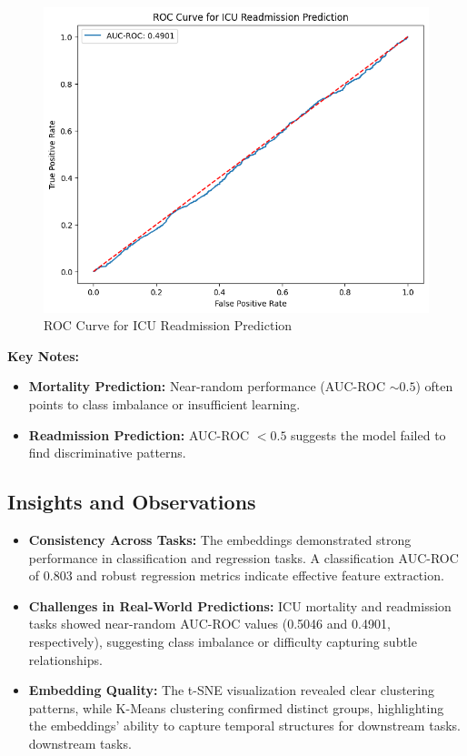 \documentclass[twocolumn]{article}
\begin{document}
    \begin{figure}[ht]
        \centering
        \includegraphics[width=0.9\linewidth]{readmission.png}
        \caption{ROC Curve for ICU Readmission Prediction}
        \label{fig:roc_readmission}
    \end{figure}
    \vspace{3cm}
    \textbf{Key Notes:}
    \begin{itemize}
        \item \textbf{Mortality Prediction:} Near-random performance (AUC-ROC $\sim
            0.5$) often points to class imbalance or insufficient learning.

        \item \textbf{Readmission Prediction:} AUC-ROC $< 0.5$ suggests the
            model failed to find discriminative patterns.
    \end{itemize}

    \subsection{Insights and Observations}

    \begin{itemize}
        \item \textbf{Consistency Across Tasks:} The embeddings demonstrated
            strong performance in classification and regression tasks. A classification
            AUC-ROC of 0.803 and robust regression metrics indicate effective feature
            extraction.

        \item \textbf{Challenges in Real-World Predictions:} ICU mortality and
            readmission tasks showed near-random AUC-ROC values (0.5046 and 0.4901,
            respectively), suggesting class imbalance or difficulty capturing
            subtle relationships.

        \item \textbf{Embedding Quality:} The t-SNE visualization revealed clear
            clustering patterns, while K-Means clustering confirmed distinct groups,
            highlighting the embeddings' ability to capture temporal structures for
            downstream tasks. downstream tasks.
    \end{itemize}
\end{document}
